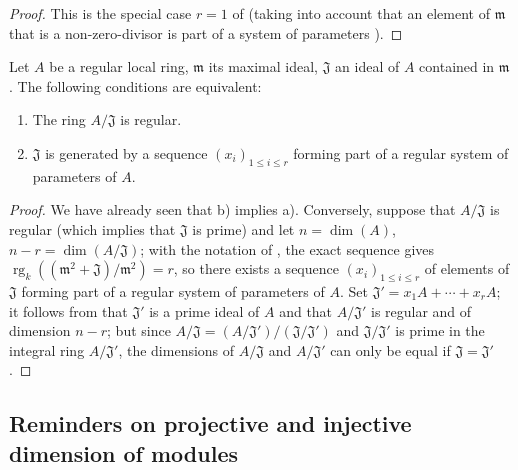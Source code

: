 \begin{proof}
This is the special case $r=1$ of  (taking into account that an element of $\mathfrak{m}$ that is a non-zero-divisor is part of a system of parameters ).
\end{proof}

\begin{corollary}[17.1.9]
\label{0.17.1.9}
Let $A$ be a regular local ring, $\mathfrak{m}$ its maximal ideal, $\mathfrak{J}$ an ideal of $A$ contained in $\mathfrak{m}$.
The following conditions are equivalent:
\begin{enumerate}
  \item[{\rm a)}] The ring $A/\mathfrak{J}$ is regular.
  \item[{\rm b)}] $\mathfrak{J}$ is generated by a sequence $(x_i)_{1\leq i\leq r}$ forming part of a regular system of parameters of $A$.
\end{enumerate}
\end{corollary}

\begin{proof}
We have already seen  that b) implies a).
Conversely, suppose that $A/\mathfrak{J}$ is regular (which implies that $\mathfrak{J}$ is prime) and let $n=\dim(A)$, $n-r=\dim(A/\mathfrak{J})$;
with the notation of , the exact sequence  gives $\operatorname{rg}_k((\mathfrak{m}^2+\mathfrak{J})/\mathfrak{m}^2)=r$, so there exists a sequence $(x_i)_{1\leq i\leq r}$ of elements of $\mathfrak{J}$ forming part of a regular system of parameters of $A$.
Set $\mathfrak{J}'=x_1 A+\cdots+x_r A$;
it follows from  that $\mathfrak{J}'$ is a prime ideal of $A$ and that $A/\mathfrak{J}'$ is regular and of dimension $n-r$;
but since $A/\mathfrak{J}=(A/\mathfrak{J}')/(\mathfrak{J}/\mathfrak{J}')$ and $\mathfrak{J}/\mathfrak{J}'$ is prime in the integral ring $A/\mathfrak{J}'$, the dimensions of $A/\mathfrak{J}$ and $A/\mathfrak{J}'$ can only be equal if $\mathfrak{J}=\mathfrak{J}'$ .
\end{proof}

\subsection{Reminders on projective and injective dimension of modules}
\label{subsection:0.17.2}

